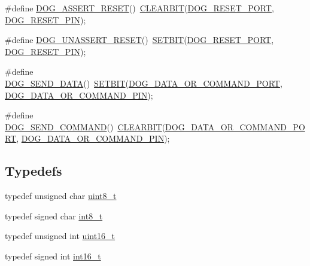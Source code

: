 \begin{DoxyCompactItemize}
\item 
\#define \hyperlink{group___d_o_g_m128__common_ga5c1cae065e6ef62966a2dae4befab749}{D\-O\-G\-\_\-\-A\-S\-S\-E\-R\-T\-\_\-\-R\-E\-S\-E\-T}()~\hyperlink{group___d_o_g_m128__common_ga8826ffc761710e6313c4c3e3188bfc13}{C\-L\-E\-A\-R\-B\-I\-T}(\hyperlink{group___d_o_g_m128__user__configuration_gadcdcd4600395a1e3f2fb35ecb2b3d929}{D\-O\-G\-\_\-\-R\-E\-S\-E\-T\-\_\-\-P\-O\-R\-T}, \hyperlink{group___d_o_g_m128__user__configuration_gab6cbac4e4756ac898479caef5b76cd29}{D\-O\-G\-\_\-\-R\-E\-S\-E\-T\-\_\-\-P\-I\-N});
\item 
\#define \hyperlink{group___d_o_g_m128__common_ga781750ddc65805308fad019f7f3185a2}{D\-O\-G\-\_\-\-U\-N\-A\-S\-S\-E\-R\-T\-\_\-\-R\-E\-S\-E\-T}()~\hyperlink{group___d_o_g_m128__common_ga62e58ee0221736142ba2ff8cacafdb9f}{S\-E\-T\-B\-I\-T}(\hyperlink{group___d_o_g_m128__user__configuration_gadcdcd4600395a1e3f2fb35ecb2b3d929}{D\-O\-G\-\_\-\-R\-E\-S\-E\-T\-\_\-\-P\-O\-R\-T}, \hyperlink{group___d_o_g_m128__user__configuration_gab6cbac4e4756ac898479caef5b76cd29}{D\-O\-G\-\_\-\-R\-E\-S\-E\-T\-\_\-\-P\-I\-N});
\item 
\#define \hyperlink{group___d_o_g_m128__common_ga367ace37414321f17523c24980fe449e}{D\-O\-G\-\_\-\-S\-E\-N\-D\-\_\-\-D\-A\-T\-A}()~\hyperlink{group___d_o_g_m128__common_ga62e58ee0221736142ba2ff8cacafdb9f}{S\-E\-T\-B\-I\-T}(\hyperlink{group___d_o_g_m128__user__configuration_ga7a79d5d66a25812afb30f2524490af3e}{D\-O\-G\-\_\-\-D\-A\-T\-A\-\_\-\-O\-R\-\_\-\-C\-O\-M\-M\-A\-N\-D\-\_\-\-P\-O\-R\-T}, \hyperlink{group___d_o_g_m128__user__configuration_ga49fc845183d9cc067238f3b6d26a0a9b}{D\-O\-G\-\_\-\-D\-A\-T\-A\-\_\-\-O\-R\-\_\-\-C\-O\-M\-M\-A\-N\-D\-\_\-\-P\-I\-N});
\item 
\#define \hyperlink{group___d_o_g_m128__common_ga40366433b74f85add18a09edfdc14fc7}{D\-O\-G\-\_\-\-S\-E\-N\-D\-\_\-\-C\-O\-M\-M\-A\-N\-D}()~\hyperlink{group___d_o_g_m128__common_ga8826ffc761710e6313c4c3e3188bfc13}{C\-L\-E\-A\-R\-B\-I\-T}(\hyperlink{group___d_o_g_m128__user__configuration_ga7a79d5d66a25812afb30f2524490af3e}{D\-O\-G\-\_\-\-D\-A\-T\-A\-\_\-\-O\-R\-\_\-\-C\-O\-M\-M\-A\-N\-D\-\_\-\-P\-O\-R\-T}, \hyperlink{group___d_o_g_m128__user__configuration_ga49fc845183d9cc067238f3b6d26a0a9b}{D\-O\-G\-\_\-\-D\-A\-T\-A\-\_\-\-O\-R\-\_\-\-C\-O\-M\-M\-A\-N\-D\-\_\-\-P\-I\-N});
\end{DoxyCompactItemize}
\subsection*{Typedefs}
\begin{DoxyCompactItemize}
\item 
typedef unsigned char \hyperlink{group___d_o_g_m128__common_gaba7bc1797add20fe3efdf37ced1182c5}{uint8\-\_\-t}
\item 
typedef signed char \hyperlink{group___d_o_g_m128__common_gaef44329758059c91c76d334e8fc09700}{int8\-\_\-t}
\item 
typedef unsigned int \hyperlink{group___d_o_g_m128__common_ga1f1825b69244eb3ad2c7165ddc99c956}{uint16\-\_\-t}
\item 
typedef signed int \hyperlink{group___d_o_g_m128__common_ga932e6ccc3d54c58f761c1aead83bd6d7}{int16\-\_\-t}
\end{DoxyCompactItemize}
